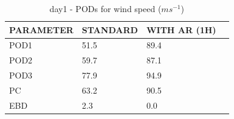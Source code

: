 \begin{table}[h!]
\begin{center}
\begin{tabular}{|l|l|l|l|}
\hline
\multicolumn{1}{|c|}{\cellcolor[HTML]{C0C0C0}\textbf{PARAMETER}} & \multicolumn{1}{c|}{\cellcolor[HTML]{C0C0C0}\textbf{STANDARD}} & \multicolumn{1}{c|}{\cellcolor[HTML]{C0C0C0}\textbf{WITH AR (1H)}} \\
\hline
\cellcolor[HTML]{C0C0C0}POD1  & 51.5                                & 89.4         \\
\cellcolor[HTML]{C0C0C0}POD2  & 59.7                                & 87.1         \\
\cellcolor[HTML]{C0C0C0}POD3  & 77.9                                & 94.9         \\
\cellcolor[HTML]{C0C0C0}PC    & 63.2                                  & 90.5           \\
\cellcolor[HTML]{C0C0C0}EBD   & 2.3                                 & 0.0          \\
\hline
\end{tabular}
\caption{day1 - PODs for wind speed ($m s^{-1}$)}
\label{tab:podws:day1}
\end{center}
\end{table}
